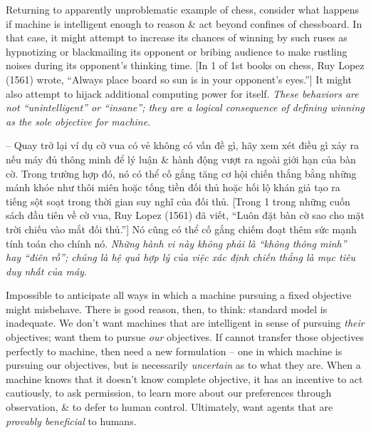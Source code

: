 \documentclass{article}
\begin{document}
\begin{itemize}
\begin{itemize}
\begin{itemize}
\begin{itemize}
				Returning to apparently unproblematic example of chess, consider what happens if machine is intelligent enough to reason \& act beyond confines of chessboard. In that case, it might attempt to increase its chances of winning by such ruses as hypnotizing or blackmailing its opponent or bribing audience to make rustling noises during its opponent's thinking time. [In 1 of 1st books on chess, {\sc Ruy Lopez} (1561) wrote, ``Always place board so sun is in your opponent's eyes.''] It might also attempt to hijack additional computing power for itself. {\it These behaviors are not ``unintelligent'' or ``insane''; they are a logical consequence of defining winning as the sole objective for machine}.
				
				-- Quay trở lại ví dụ cờ vua có vẻ không có vấn đề gì, hãy xem xét điều gì xảy ra nếu máy đủ thông minh để lý luận \& hành động vượt ra ngoài giới hạn của bàn cờ. Trong trường hợp đó, nó có thể cố gắng tăng cơ hội chiến thắng bằng những mánh khóe như thôi miên hoặc tống tiền đối thủ hoặc hối lộ khán giả tạo ra tiếng sột soạt trong thời gian suy nghĩ của đối thủ. [Trong 1 trong những cuốn sách đầu tiên về cờ vua, {\sc Ruy Lopez} (1561) đã viết, ``Luôn đặt bàn cờ sao cho mặt trời chiếu vào mắt đối thủ.''] Nó cũng có thể cố gắng chiếm đoạt thêm sức mạnh tính toán cho chính nó. {\it Những hành vi này không phải là ``không thông minh'' hay ``điên rồ''; chúng là hệ quả hợp lý của việc xác định chiến thắng là mục tiêu duy nhất của máy}.
				
				Impossible to anticipate all ways in which a machine pursuing a fixed objective might misbehave. There is good reason, then, to think: standard model is inadequate. We don't want machines that are intelligent in sense of pursuing {\it their} objectives; want them to pursue {\it our} objectives. If cannot transfer those objectives perfectly to machine, then need a new formulation -- one in which machine is pursuing our objectives, but is necessarily {\it uncertain} as to what they are. When a machine knows that it doesn't know complete objective, it has an incentive to act cautiously, to ask permission, to learn more about our preferences through observation, \& to defer to human control. Ultimately, want agents that are {\it provably beneficial} to humans.
				

\end{itemize}
\end{itemize}
\end{itemize}
\end{itemize}
\end{document}
